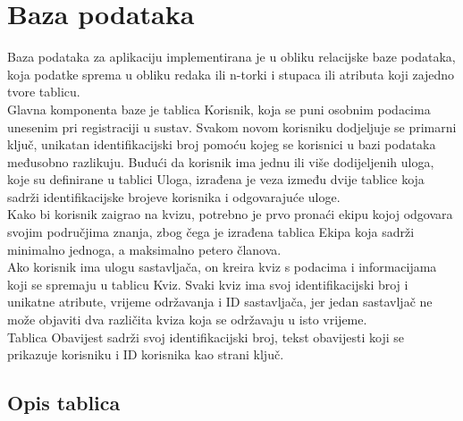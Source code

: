 				
		\section{Baza podataka}

		Baza podataka za aplikaciju implementirana je u obliku relacijske baze podataka, koja podatke sprema u obliku redaka ili n-torki i stupaca ili atributa koji zajedno tvore tablicu.  \\
Glavna komponenta baze je tablica Korisnik, koja se puni osobnim podacima unesenim pri registraciji u sustav.  Svakom novom korisniku dodjeljuje se primarni ključ, unikatan identifikacijski broj pomoću kojeg se korisnici u bazi podataka međusobno razlikuju. Budući da korisnik ima jednu ili više dodijeljenih uloga, koje su definirane u tablici Uloga, izrađena je veza između dvije tablice koja sadrži identifikacijske brojeve korisnika i odgovarajuće uloge. \\
Kako bi korisnik zaigrao na kvizu, potrebno je prvo pronaći ekipu kojoj odgovara svojim područjima znanja, zbog čega je izrađena tablica Ekipa koja sadrži minimalno jednoga, a maksimalno petero članova.  \\
Ako korisnik ima ulogu sastavljača, on kreira kviz s podacima i informacijama koji se spremaju u tablicu Kviz.  Svaki kviz ima svoj identifikacijski broj i unikatne atribute, vrijeme održavanja i ID sastavljača, jer jedan sastavljač ne može objaviti dva različita kviza koja se održavaju u isto vrijeme.  \\
Tablica Obavijest sadrži svoj identifikacijski broj, tekst obavijesti koji se prikazuje korisniku i ID korisnika kao strani ključ. \\

		
			\subsection{Opis tablica}
				
